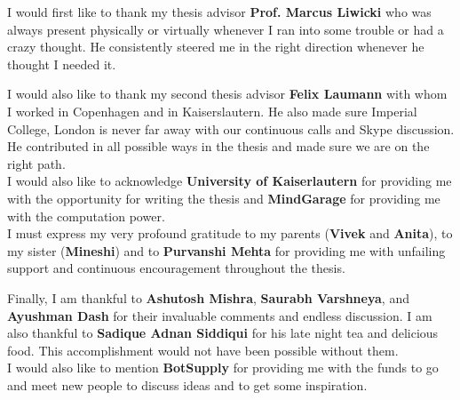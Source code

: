 
\begin{acknowledgements}      

I would first like to thank my thesis advisor \textbf{Prof. Marcus Liwicki} who was always present physically or virtually whenever I ran into some trouble or had a crazy thought. He consistently steered me in the right direction whenever he thought I needed it.

I would also like to thank my second thesis advisor \textbf{Felix Laumann} with whom I worked in Copenhagen and in Kaiserslautern. He also made sure Imperial College, London is never far away with our continuous calls and Skype discussion. He contributed in all possible ways in the thesis and made sure we are on the right path. \\

I would also like to acknowledge \textbf{University of Kaiserlautern} for providing me with the opportunity for writing the thesis and \textbf{MindGarage} for providing me with the computation power.\\

I must express my very profound gratitude to my parents (\textbf{Vivek} and \textbf{Anita}), to my sister (\textbf{Mineshi}) and to \textbf{Purvanshi Mehta} for providing me with unfailing support and continuous encouragement throughout the thesis. 

Finally, I am thankful to \textbf{Ashutosh Mishra}, \textbf{Saurabh Varshneya}, and \textbf{Ayushman Dash} for their invaluable comments and endless discussion. I am also thankful to \textbf{Sadique Adnan Siddiqui} for his late night tea and delicious food. This accomplishment would not have been possible without them. \\

I would also like to mention \textbf{BotSupply} for providing me with the funds to go and meet new people to discuss ideas and to get some inspiration. \\ \\


 
\end{acknowledgements}

